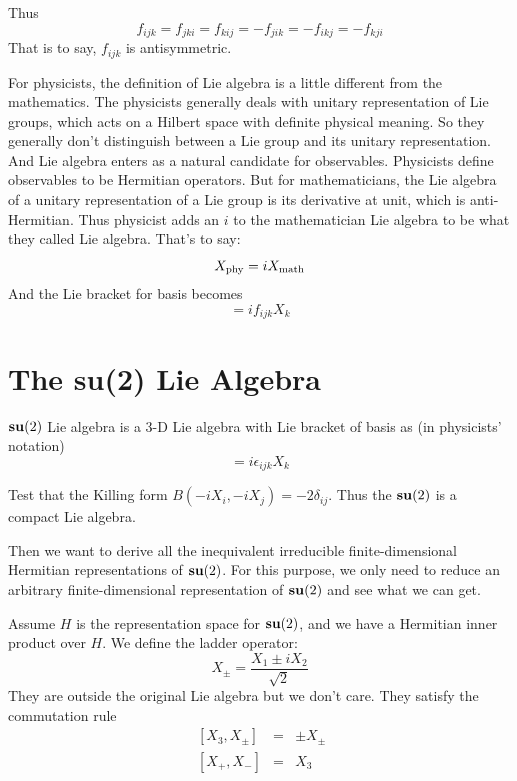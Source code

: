 \documentclass[12pt]{book}
\begin{document}
	Thus
	\begin{equation}
		f_{ijk}=f_{jki}=f_{kij}=-f_{jik}=-f_{ikj}=-f_{kji}
	\end{equation}	
	That is to say, $f_{ijk}$ is antisymmetric.
	
	For physicists, the definition of Lie algebra is a little different from the mathematics. The physicists generally deals with unitary representation of Lie groups, which acts on a Hilbert space with definite physical meaning. So they generally don't distinguish between a Lie group and its unitary representation. And Lie algebra enters as a natural candidate for observables. Physicists define observables to be Hermitian operators. But for mathematicians, the Lie algebra of a unitary representation of a Lie group is its derivative at unit, which is anti-Hermitian. Thus physicist adds an $i$ to the mathematician Lie algebra to be what they called Lie algebra. That's to say:
	\begin{equation}
		X_{\rm phy}=iX_{\rm math}
	\end{equation}
	And the Lie bracket for basis becomes
	\begin{equation}
		[X_i,X_j]=if_{ijk}X_k
	\end{equation}
	\section{The su(2) Lie Algebra}
	${\bf su}(2)$ Lie algebra is a 3-D Lie algebra with Lie bracket of basis as (in physicists' notation) 
	\begin{equation}
		[X_i,X_j]=i\epsilon_{ijk}X_k
	\end{equation}
	\begin{myExercise}
		Test that the Killing form $B(-iX_i,-iX_j)=-2\delta_{ij}$. Thus the ${\bf su}(2)$ is a compact Lie algebra.
	\end{myExercise}
	
	Then we want to derive all the inequivalent irreducible finite-dimensional Hermitian representations of ${\bf su}(2)$. For this purpose, we only need to reduce an arbitrary finite-dimensional representation of ${\bf su}(2)$ and see what we can get. 
	
	Assume $H$ is the representation space for ${\bf su}(2)$, and we have a Hermitian inner product over $H$. We define the ladder operator:
	\begin{equation}
		X_\pm=\frac {X_1\pm iX_2}{\sqrt 2}
	\end{equation}
	They are outside the original Lie algebra but we don't care. They satisfy the commutation rule
	\begin{eqnarray}
		\ [X_3,X_\pm]&=&\pm X_\pm\\
		\ [X_+,X_-]&=&X_3
	\end{eqnarray}
	
\end{document}
